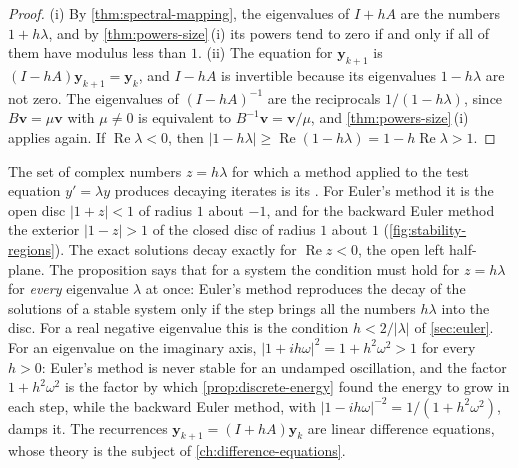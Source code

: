 \begin{proof}
(i) By \cref{thm:spectral-mapping}, the eigenvalues of $I+hA$ are the numbers $1+h\lambda$, and by \cref{thm:powers-size}\,(i) its powers tend to zero if and only if all of them have modulus less than $1$. (ii) The equation for $\mathbf y_{k+1}$ is $(I-hA)\mathbf y_{k+1}=\mathbf y_k$, and $I-hA$ is invertible because its eigenvalues $1-h\lambda$ are not zero. The eigenvalues of $(I-hA)^{-1}$ are the reciprocals $1/(1-h\lambda)$, since $B\mathbf v=\mu\mathbf v$ with $\mu\ne0$ is equivalent to $B^{-1}\mathbf v=\mathbf v/\mu$, and \cref{thm:powers-size}\,(i) applies again. If $\operatorname{Re}\lambda<0$, then $|1-h\lambda|\ge\operatorname{Re}(1-h\lambda)=1-h\operatorname{Re}\lambda>1$.
\end{proof}

The set of complex numbers $z=h\lambda$ for which a method applied to the test equation $y'=\lambda y$ produces decaying iterates is its . For Euler's method it is the open disc $|1+z|<1$ of radius $1$ about $-1$, and for the backward Euler method the exterior $|1-z|>1$ of the closed disc of radius $1$ about $1$ (\cref{fig:stability-regions}). The exact solutions decay exactly for $\operatorname{Re}z<0$, the open left half-plane. The proposition says that for a system the condition must hold for $z=h\lambda$ for \emph{every} eigenvalue $\lambda$ at once: Euler's method reproduces the decay of the solutions of a stable system only if the step brings all the numbers $h\lambda$ into the disc. For a real negative eigenvalue this is the condition $h<2/|\lambda|$ of \cref{sec:euler}. For an eigenvalue on the imaginary axis, $|1+ih\omega|^2=1+h^2\omega^2>1$ for every $h>0$: Euler's method is never stable for an undamped oscillation, and the factor $1+h^2\omega^2$ is the factor by which \cref{prop:discrete-energy} found the energy to grow in each step, while the backward Euler method, with $|1-ih\omega|^{-2}=1/(1+h^2\omega^2)$, damps it. The recurrences $\mathbf y_{k+1}=(I+hA)\mathbf y_k$ are linear difference equations, whose theory is the subject of \cref{ch:difference-equations}.

